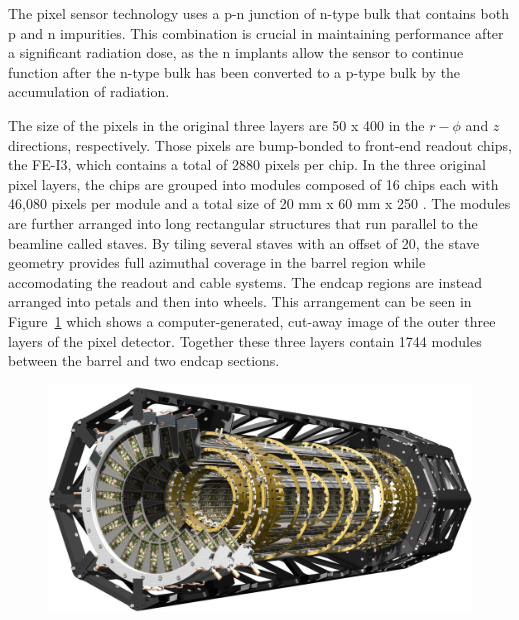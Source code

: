 The pixel sensor technology uses a p-n junction of n-type bulk that contains both p\tsup{+} and n\tsup{+} impurities.
This combination is crucial in maintaining performance after a significant radiation dose, as the n\tsup{+} implants allow the sensor to continue function after the n-type bulk has been converted to a p-type bulk by the accumulation of radiation.

The size of the pixels in the original three layers are 50 \um x 400 \um in the $r-\phi$ and $z$ directions, respectively.
Those pixels are bump-bonded to front-end readout chips, the FE-I3, which contains a total of 2880 pixels per chip. 
In the three original pixel layers, the chips are grouped into modules composed of 16 chips each with 46,080 pixels per module and a total size of 20 mm x 60 mm x 250 \um. 
The modules are further arranged into long rectangular structures that run parallel to the beamline called staves.
By tiling several staves with an offset of 20\textdegree, the stave geometry provides full azimuthal coverage in the barrel region while accomodating the readout and cable systems.
The endcap regions are instead arranged into petals and then into wheels. 
This arrangement can be seen in Figure~\ref{fig:pixel_overview} which shows a computer-generated, cut-away image of the outer three layers of the pixel detector.
Together these three layers contain 1744 modules between the barrel and two endcap sections.

\begin{figure}[hbtp]
\includegraphics[width=\fullfig]{figures/pixel_overview.pdf}
\caption{}
\label{fig:pixel_overview}
\end{figure}

